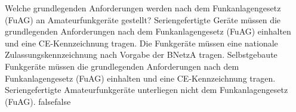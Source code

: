     {Welche grundlegenden Anforderungen werden nach dem Funkanlagengesetz (FuAG) an Amateurfunkgeräte gestellt?}
    {Seriengefertigte Geräte müssen die grundlegenden Anforderungen nach dem Funkanlagengesetz (FuAG) einhalten und eine CE-Kennzeichnung tragen.}
    {Die Funkgeräte müssen eine nationale Zulassungskennzeichnung nach Vorgabe der BNetzA tragen.}
    {Selbstgebaute Funkgeräte müssen die grundlegenden Anforderungen nach dem Funkanlagengesetz (FuAG) einhalten und eine CE-Kennzeichnung tragen.}
    {Seriengefertigte Amateurfunkgeräte unterliegen nicht dem Funkanlagengesetz (FuAG).}
    {false}{false}